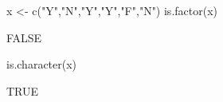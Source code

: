 \begin{Schunk}
\begin{Sinput}
   x <- c("Y","N","Y","Y","F","N")
  is.factor(x)
\end{Sinput}
\begin{Soutput}
[1] FALSE
\end{Soutput}
\begin{Sinput}
  is.character(x)
\end{Sinput}
\begin{Soutput}
[1] TRUE
\end{Soutput}
\end{Schunk}
